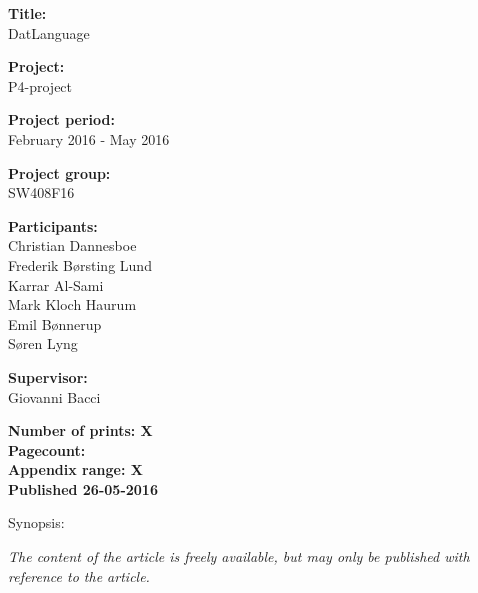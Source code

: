\begin{minipage}[t]{0.48\textwidth}
\textbf{Title:} \\[5pt]\bigskip\hspace{2ex}
DatLanguage

\textbf{Project:} \\[5pt]\bigskip\hspace{2ex}
P4-project

\textbf{Project period:} \\[5pt]\bigskip\hspace{2ex}
February 2016 - May 2016

\textbf{Project group:} \\[5pt]\bigskip\hspace{2ex}
SW408F16	

\textbf{Participants:} \\[5pt]\hspace*{2ex}
Christian Dannesboe \\\hspace*{2ex}
Frederik Børsting Lund \\\hspace*{2ex}
Karrar Al-Sami \\\hspace*{2ex}
Mark Kloch Haurum \\\hspace*{2ex}
Emil Bønnerup \\\hspace*{2ex}
Søren Lyng \\\hspace*{2ex}

\textbf{Supervisor:} \\[5pt]\hspace*{2ex}
Giovanni Bacci

\vspace*{1cm}

\textbf{Number of prints: X} \\
\textbf{Pagecount: \pageref{LastPage}} \\
\textbf{Appendix range: X} \\ 
\textbf{Published 26-05-2016}

\end{minipage}
\hfill
\begin{minipage}[t]{0.483\textwidth}
Synopsis: \\[5pt]
\fbox{\parbox{7cm}{\bigskip\bigskip}}
\end{minipage}

\vfill

{\footnotesize\itshape The content of the article is freely available, but may only be published with reference to the article.}


